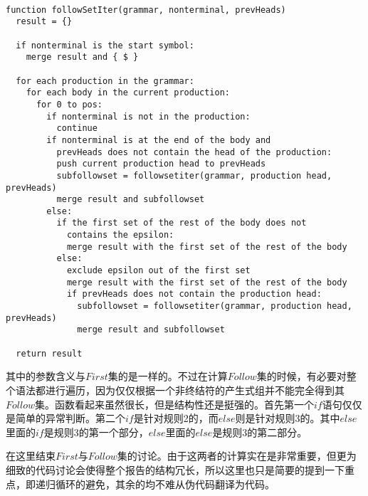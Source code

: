 \begin{verbatim}

function followSetIter(grammar, nonterminal, prevHeads)
  result = {}

  if nonterminal is the start symbol:
    merge result and { $ }

  for each production in the grammar:
    for each body in the current production:
      for 0 to pos:
        if nonterminal is not in the production:
          continue
        if nonterminal is at the end of the body and
          prevHeads does not contain the head of the production:
          push current production head to prevHeads
          subfollowset = followsetiter(grammar, production head, prevHeads)
          merge result and subfollowset
        else:
          if the first set of the rest of the body does not
            contains the epsilon:
            merge result with the first set of the rest of the body
          else:
            exclude epsilon out of the first set
            merge result with the first set of the rest of the body
            if prevHeads does not contain the production head:
              subfollowset = followsetiter(grammar, production head, prevHeads)
              merge result and subfollowset
              
  return result

\end{verbatim}

其中的参数含义与$First$集的是一样的。不过在计算$Follow$集的时候，有必要对整个语法都进行遍历，因为仅仅根据一个非终结符的产生式组并不能完全得到其$Follow$集。函数看起来虽然很长，但是结构性还是挺强的。首先第一个$if$语句仅仅是简单的异常判断。第二个$if$是针对规则2的，而$else$则是针对规则3的。其中$else$里面的$if$是规则3的第一个部分，$else$里面的$else$是规则3的第二部分。

在这里结束$First$与$Follow$集的讨论。由于这两者的计算实在是非常重要，但更为细致的代码讨论会使得整个报告的结构冗长，所以这里也只是简要的提到一下重点，即递归循环的避免，其余的均不难从伪代码翻译为代码。


\newpage

